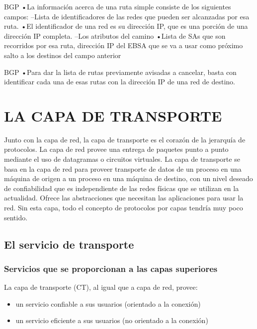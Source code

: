 \documentclass[10pt,a4paper]{report}
\begin{document}
BGP
•La información acerca de una ruta simple consiste de los siguientes campos:
–Lista de identificadores de las redes que pueden ser alcanzadas por esa ruta.
•El identificador de una red es su dirección IP, que es una porción de una dirección IP completa.
–Los atributos del camino
•Lista de SAs que son recorridos por esa ruta, dirección IP del EBSA que se va a usar como próximo salto a los destinos del campo anterior



BGP
•Para dar la lista de rutas previamente avisadas a cancelar, basta con identificar cada una de esas rutas con la dirección IP de una red de destino.





\chapter{LA CAPA DE TRANSPORTE}
\par Junto con la capa de red, la capa de transporte es el corazón de la jerarquía de 
protocolos. La capa de red provee una entrega de paquetes punto a punto mediante 
el uso de datagramas o circuitos virtuales. La capa de transporte se basa en la capa 
de red para proveer transporte de datos de un proceso en una máquina de origen a 
un proceso en una máquina de destino, con un nivel deseado de confiabilidad que es 
independiente de las redes físicas que se utilizan en la actualidad. Ofrece las 
abstracciones que necesitan las aplicaciones para usar la red. Sin esta capa, todo el 
concepto de protocolos por capas tendría muy poco sentido.


\section{El servicio de transporte}
\subsection{Servicios que se proporcionan a las capas superiores}
\par La capa de transporte (CT), al igual que a capa de red, provee:
	\begin{itemize}
		\item un servicio confiable a sus usuarios (orientado a la conexión)
		\item un servicio eficiente a sus usuarios (no orientado a la conexión)
	\end{itemize}
	
\end{document}
